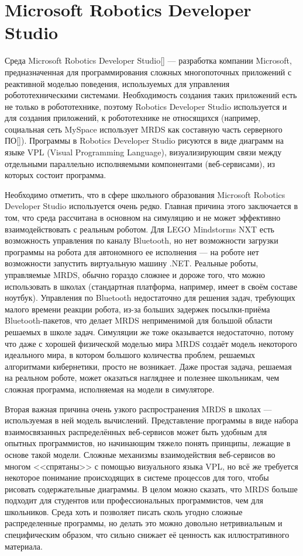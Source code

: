 \documentclass[a5paper]{article}
\begin{document}
\section{Microsoft Robotics Developer Studio}

Среда Microsoft Robotics Developer Studio[] --- разработка компании Microsoft, предназначенная для программирования 
сложных многопоточных приложений с реактивной моделью поведения, используемых для управления робототехническими системами. 
Необходимость создания таких приложений есть не только в робототехнике, поэтому Robotics Developer Studio используется 
и для создания приложений, к робототехнике не относящихся (например, социальная сеть MySpace использует MRDS 
как составную часть серверного ПО[]). Программы в Robotics Developer Studio рисуются в виде диаграмм на 
языке VPL (Visual Programming Language), визуализирующим связи между отдельными параллельно исполняемыми 
компонентами (веб-сервисами), из которых состоит программа.

Необходимо отметить, что в сфере школьного образования Microsoft Robotics Developer Studio используется очень редко. 
Главная причина этого заключается в том, что среда рассчитана в основном на симуляцию и не может эффективно 
взаимодействовать с реальным роботом. Для LEGO Mindstorms NXT есть возможность управления по каналу Bluetooth, 
но нет возможности загрузки программы на робота для автономного ее исполнения --- на роботе нет возможности 
запустить виртуальную машину .NET. Реальные роботы, управляемые MRDS, обычно гораздо сложнее и дороже того, 
что можно использовать в школах (стандартная платформа, например, имеет в своём составе ноутбук). Управления 
по Bluetooth недостаточно для решения задач, требующих малого времени реакции робота, из-за больших задержек 
посылки-приёма Bluetooth-пакетов, что делает MRDS неприменимой для большой области решаемых в школе задач. Симуляции 
же тоже оказывается недостаточно, потому что даже с хорошей физической моделью мира MRDS создаёт модель некоторого 
идеального мира, в котором большого количества проблем, решаемых алгоритмами кибернетики, просто не возникает. 
Даже простая задача, решаемая на реальном роботе, может оказаться нагляднее и полезнее школьникам, чем сложная 
программа, исполняемая на модели в симуляторе.

Вторая важная причина очень узкого распространения MRDS в школах --- используемая в ней модель вычислений. 
Представление программы в виде набора взаимосвязанных распределённых веб-сервисов может быть удобным для 
опытных программистов, но начинающим тяжело понять принципы, лежащие в основе такой модели. Сложные механизмы 
взаимодействия веб-сервисов во многом <<спрятаны>> с помощью визуального языка VPL, но всё же требуется некоторое 
понимание происходящих в системе процессов для того, чтобы рисовать содержательные диаграммы. В целом можно сказать, 
что MRDS больше подходит для студентов или профессиональных программистов, чем для школьников. Среда хоть и 
позволяет писать сколь угодно сложные распределенные программы, но делать это можно довольно нетривиальным и 
специфическим образом, что сильно снижает её ценность как иллюстративного материала.
\end{document}
